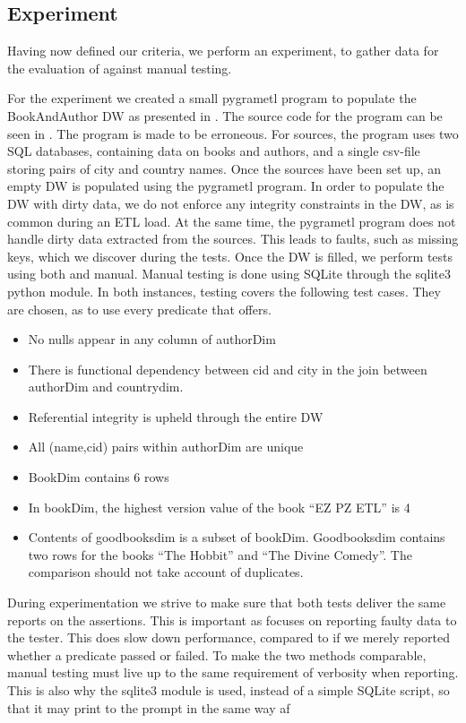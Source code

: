 \subsection{Experiment}
Having now defined our criteria, we perform an experiment, to gather data for the evaluation of \FW{} against manual testing.

For the experiment we created a small pygrametl program to populate the BookAndAuthor DW as presented in . The source code for the program can be seen in . The program is made to be erroneous. For sources, the program uses two SQL databases, containing data on books and authors, and a single csv-file storing pairs of city and country names. Once the sources have been set up, an empty DW is populated using the pygrametl program. In order to populate the DW with dirty data, we do not enforce any integrity constraints in the DW, as is common during an ETL load. At the same time, the pygrametl program does not handle dirty data extracted from the sources. This leads to faults, such as missing keys, which we discover during the tests. Once the DW is filled, we perform tests using both \FW{} and manual. Manual testing is done using SQLite through the sqlite3 python module. In both instances, testing covers the following test cases. They are chosen, as to use every predicate that \FW{} offers.

\begin{itemize}
\item No nulls appear in any column of authorDim
\item There is functional dependency between cid and city in the join between authorDim and countrydim.
\item Referential integrity is upheld through the entire DW
\item All (name,cid) pairs within authorDim are unique
\item BookDim contains 6 rows
\item In bookDim, the highest version value of the book “EZ PZ ETL” is 4
\item Contents of goodbooksdim is a subset of bookDim. Goodbooksdim contains two rows for the books “The Hobbit” and “The Divine Comedy”. The comparison should not take account of duplicates.
\end{itemize}

During experimentation we strive to make sure that both tests deliver the same reports on the assertions. This is important as \FW{} focuses on reporting faulty data to the tester. This does slow down performance, compared to if we merely reported whether a predicate passed or failed. To make the two methods comparable, manual testing must live up to the same requirement of verbosity when reporting. This is also why the sqlite3 module is used, instead of a simple SQLite script, so that it may print to the prompt in the same way af \FW{}

